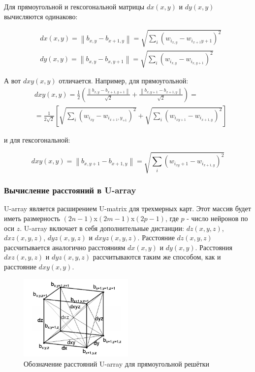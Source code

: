 \documentclass[a4paper,12pt]{article}
\begin{document}
Для прямоугольной и гексогональной матрицы $dx(x, y)$ и $dy(x, y)$ вычисляются одинаково:

$$\begin{aligned}
  &d x(x, y)=\left\|b_{x, y}-b_{x+1, y}\right\|=\sqrt{\sum_{i}\left(w_{i_{x, y}}-w_{i_{x+1} y+1}\right)^{2}}\\
  &d y(x, y)=\left\|b_{x, y}-b_{x, y+1}\right\|=\sqrt{\sum_{i}\left(w_{i_{x, y}}-w_{i_{x, y+1}}\right)^{2}}
\end{aligned}$$

А вот $dxy(x, y)$ отличается. Например, для прямоугольной:
$$\begin{aligned}
  &d x y(x, y)=\frac{1}{2}\left(\frac{\left\|b_{x, y}-b_{x+1, y+1}\right\|}{\sqrt{2}}+\frac{\left\|b_{x, y+1}-b_{x+1, y}\right\|}{\sqrt{2}}\right)=\\
  &=\frac{1}{2 \sqrt{2}}[\sqrt{\sum_{i}\left(w_{i_{x y}}-w_{i_{x+1}, y_{+1}}\right)^{2}}+\sqrt{\sum_{i}\left(w_{i_{x y+1}}-w_{i_{x+1, y}}\right)^{2}}]
  \end{aligned}$$

и для гексогональной:

$$d x y(x, y)=\left\|b_{x, y+1}-b_{x+1, y}\right\|=\sqrt{\sum_{i}\left(w_{i_{x y}+1}-w_{i_{x+1, y}}\right)^{2}}$$

\subsubsection{Вычисление расстояний в U-array}

U-array является расширением U-matrix для трехмерных карт. Этот массив будет иметь размерность $(2n-1)$x$(2m-1)$x$(2p-1)$, где $p$ - число нейронов по оси $z$. U-array включает в себя дополнительные дистанции: $dz(x,y,z)$, $dxz(x,y,z)$, $dyz(x,y,z)$ и $dxyz(x,y,z)$. Расстояние $dz(x,y,z)$ рассчитывается аналогично расстояниям $dx(x,y)$ и $dy(x,y)$. Расстояния $dxz(x,y,z)$ и $dyz(x,y,z)$ рассчитываются таким же способом, как и расстояние $dxy(x,y)$.

\begin{figure}[H]
  \centering
  \includegraphics[width=0.5\textwidth]{u-array-rec-distance.png}
  \caption{Обозначение расстояний U-array для прямоугольной решётки}
  \label{u-array-rec-distance}
\end{figure}
\end{document}
